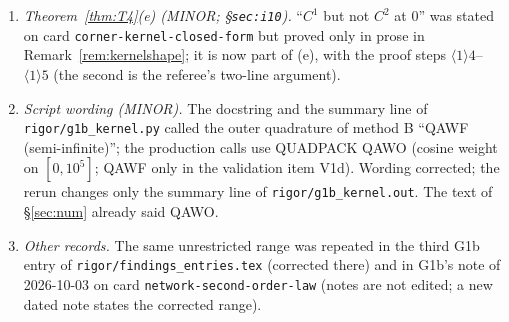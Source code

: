 \documentclass[11pt]{article}
\newcommand{\norm}[1]{\lVert#1\rVert}\newcommand{\abs}[1]{\lvert#1\rvert}\newcommand{\ip}[2]{\langle#1,#2\rangle}
\theoremstyle{definition}\newtheorem{hypothesis}[theorem]{Hypothesis}
\begin{document}
\begin{enumerate}[label=(R\arabic*),leftmargin=2.6em]
 condition $\sqrt2\,s\max_j\zeta_j\norm k_2<1$ (the index-zero range of the factor bounds used through
 Theorem~\ref{thm:T3}$\langle1\rangle5$) is added; it holds for $s\le s_\eps$ uniformly on $\mathcal Z$, so the
 statement of Theorem~\ref{thm:T5} is unchanged.
\item\label{corrR4} \emph{Theorem~\ref{thm:T4}(e) (MINOR; \S\texttt{sec:i10}).}  ``$C^1$ but not $C^2$ at $0$'' was
 stated on card \texttt{corner-kernel-closed-form} but proved only in prose in Remark~\ref{rem:kernelshape}; it is
 now part of (e), with the proof steps $\langle1\rangle4$--$\langle1\rangle5$ (the second is the referee's
 two-line argument).
\item\label{corrR5} \emph{Script wording (MINOR).}  The docstring and the summary line of
 \texttt{rigor/g1b\_kernel.py} called the outer quadrature of method B ``QAWF (semi-infinite)''; the production
 calls use QUADPACK QAWO (cosine weight on $[0,10^5]$; QAWF only in the validation item V1d).  Wording
 corrected; the rerun changes only the summary line of \texttt{rigor/g1b\_kernel.out}.  The text of \S\ref{sec:num}
 already said QAWO.
\item\label{corrR6} \emph{Other records.}  The same unrestricted range was repeated in the third G1b entry of
 \texttt{rigor/findings\_entries.tex} (corrected there) and in G1b's note of 2026-10-03 on card
 \texttt{network-second-order-law} (notes are not edited; a new dated note states the corrected range).
\end{enumerate}
\end{document}
